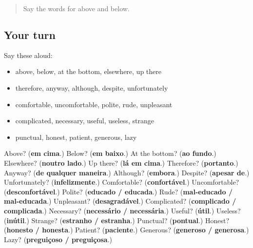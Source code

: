 \label{lesson:PT-R155-second-pass-words-from-chapters-151-155}



\begin{quote}
Say the words for above and below.
\end{quote}

\subsection*{Your turn}
Say these aloud:

\begin{itemize}
\raggedright
  \item above, below, at the bottom, elsewhere, up there
  \item therefore, anyway, although, despite, unfortunately
  \item comfortable, uncomfortable, polite, rude, unpleasant
  \item complicated, necessary, useful, useless, strange
  \item punctual, honest, patient, generous, lazy
\end{itemize}

\begin{tcolorbox}[breakable,colback=teal!4,colframe=teal!35!black,title={Before you move on}]
Above? (\textbf{em cima}.) Below? (\textbf{em baixo}.) At the bottom? (\textbf{ao fundo}.) Elsewhere? (\textbf{noutro lado}.) Up there? (\textbf{lá em cima}.) Therefore? (\textbf{portanto}.) Anyway? (\textbf{de qualquer maneira}.) Although? (\textbf{embora}.) Despite? (\textbf{apesar de}.) Unfortunately? (\textbf{infelizmente}.) Comfortable? (\textbf{confortável}.) Uncomfortable? (\textbf{desconfortável}.) Polite? (\textbf{educado / educada}.) Rude? (\textbf{mal-educado / mal-educada}.) Unpleasant? (\textbf{desagradável}.) Complicated? (\textbf{complicado / complicada}.) Necessary? (\textbf{necessário / necessária}.) Useful? (\textbf{útil}.) Useless? (\textbf{inútil}.) Strange? (\textbf{estranho / estranha}.) Punctual? (\textbf{pontual}.) Honest? (\textbf{honesto / honesta}.) Patient? (\textbf{paciente}.) Generous? (\textbf{generoso / generosa}.) Lazy? (\textbf{preguiçoso / preguiçosa}.)
\end{tcolorbox}
